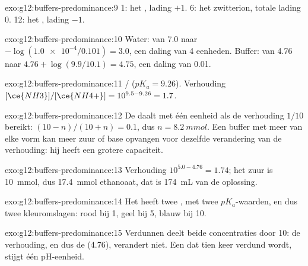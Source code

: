 \begin{solution}{exo:g12:buffers-predominance:9}
 1: het  , lading $+1$.  6: het zwitterion,
totale lading 0.  12: het  , lading $-1$.
\end{solution}

\begin{solution}{exo:g12:buffers-predominance:10}
Water: van 7.0 naar $-\log(\num{1.0e-4}/0.101) = 3.0$, een daling van 4
eenheden. Buffer: van 4.76 naar $4.76 + \log(9.9/10.1) = 4.75$, een
daling van 0.01.
\end{solution}

\begin{solution}{exo:g12:buffers-predominance:11}
/ ($pK_a = 9.26$). Verhouding
$[\ce{NH3}]/[\ce{NH4+}] = 10^{9.5 - 9.26} = 1.7$.
\end{solution}

\begin{solution}{exo:g12:buffers-predominance:12}
De  daalt met één eenheid als de verhouding $1/10$ bereikt:
$(10 - n)/(10 + n) = 0.1$, dus $n = \qty{8.2}{mmol}$. Een buffer met meer
van elke vorm kan meer zuur of base opvangen voor dezelfde verandering van
de verhouding: hij heeft een grotere capaciteit.
\end{solution}

\begin{solution}{exo:g12:buffers-predominance:13}
Verhouding $10^{5.0 - 4.76} = 1.74$; het zuur is \qty{10}{mmol}, dus
\qty{17.4}{mmol} ethanoaat, dat is \qty{174}{mL} van de oplossing.
\end{solution}

\begin{solution}{exo:g12:buffers-predominance:14}
Het heeft twee , met twee $pK_a$-waarden, en dus twee
kleuromslagen: rood bij  1, geel bij  5, blauw bij  10.
\end{solution}

\begin{solution}{exo:g12:buffers-predominance:15}
Verdunnen deelt beide concentraties door 10: de verhouding, en dus de 
(4.76), verandert niet. Een  dat tien keer verdund wordt, stijgt
één pH-eenheid.
\end{solution}


